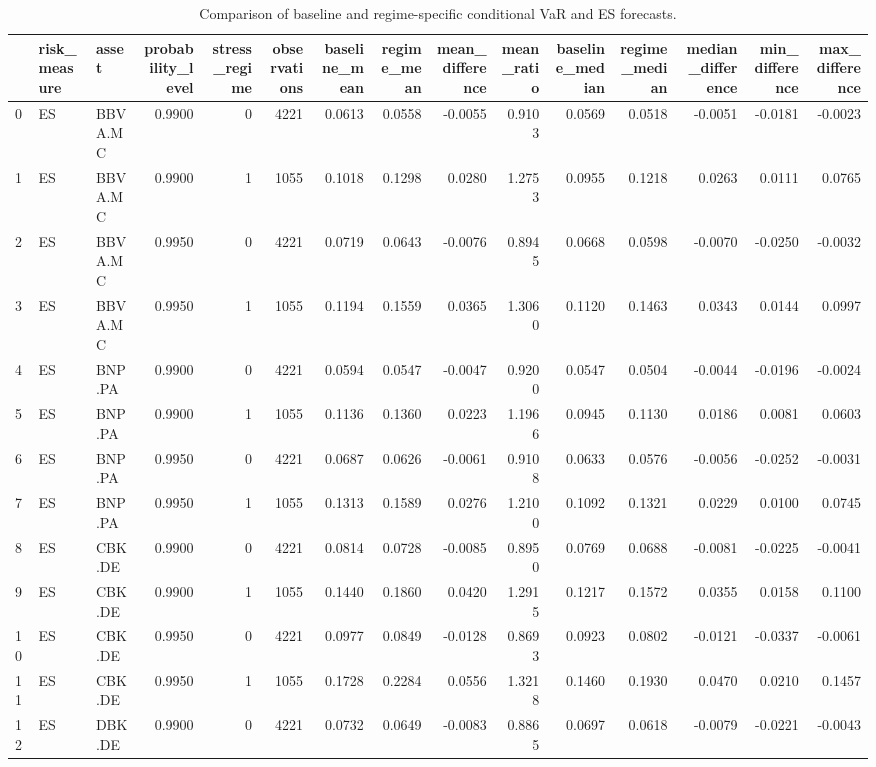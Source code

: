 \begin{table}
\caption{Comparison of baseline and regime-specific conditional VaR and ES forecasts.}
\label{tab:baseline_regime_risk_comparison}
\begin{tabular}{lllrrrrrrrrrrrr}
\toprule
 & risk_measure & asset & probability_level & stress_regime & observations & baseline_mean & regime_mean & mean_difference & mean_ratio & baseline_median & regime_median & median_difference & min_difference & max_difference \\
\midrule
0 & ES & BBVA.MC & 0.9900 & 0 & 4221 & 0.0613 & 0.0558 & -0.0055 & 0.9103 & 0.0569 & 0.0518 & -0.0051 & -0.0181 & -0.0023 \\
1 & ES & BBVA.MC & 0.9900 & 1 & 1055 & 0.1018 & 0.1298 & 0.0280 & 1.2753 & 0.0955 & 0.1218 & 0.0263 & 0.0111 & 0.0765 \\
2 & ES & BBVA.MC & 0.9950 & 0 & 4221 & 0.0719 & 0.0643 & -0.0076 & 0.8945 & 0.0668 & 0.0598 & -0.0070 & -0.0250 & -0.0032 \\
3 & ES & BBVA.MC & 0.9950 & 1 & 1055 & 0.1194 & 0.1559 & 0.0365 & 1.3060 & 0.1120 & 0.1463 & 0.0343 & 0.0144 & 0.0997 \\
4 & ES & BNP.PA & 0.9900 & 0 & 4221 & 0.0594 & 0.0547 & -0.0047 & 0.9200 & 0.0547 & 0.0504 & -0.0044 & -0.0196 & -0.0024 \\
5 & ES & BNP.PA & 0.9900 & 1 & 1055 & 0.1136 & 0.1360 & 0.0223 & 1.1966 & 0.0945 & 0.1130 & 0.0186 & 0.0081 & 0.0603 \\
6 & ES & BNP.PA & 0.9950 & 0 & 4221 & 0.0687 & 0.0626 & -0.0061 & 0.9108 & 0.0633 & 0.0576 & -0.0056 & -0.0252 & -0.0031 \\
7 & ES & BNP.PA & 0.9950 & 1 & 1055 & 0.1313 & 0.1589 & 0.0276 & 1.2100 & 0.1092 & 0.1321 & 0.0229 & 0.0100 & 0.0745 \\
8 & ES & CBK.DE & 0.9900 & 0 & 4221 & 0.0814 & 0.0728 & -0.0085 & 0.8950 & 0.0769 & 0.0688 & -0.0081 & -0.0225 & -0.0041 \\
9 & ES & CBK.DE & 0.9900 & 1 & 1055 & 0.1440 & 0.1860 & 0.0420 & 1.2915 & 0.1217 & 0.1572 & 0.0355 & 0.0158 & 0.1100 \\
10 & ES & CBK.DE & 0.9950 & 0 & 4221 & 0.0977 & 0.0849 & -0.0128 & 0.8693 & 0.0923 & 0.0802 & -0.0121 & -0.0337 & -0.0061 \\
11 & ES & CBK.DE & 0.9950 & 1 & 1055 & 0.1728 & 0.2284 & 0.0556 & 1.3218 & 0.1460 & 0.1930 & 0.0470 & 0.0210 & 0.1457 \\
12 & ES & DBK.DE & 0.9900 & 0 & 4221 & 0.0732 & 0.0649 & -0.0083 & 0.8865 & 0.0697 & 0.0618 & -0.0079 & -0.0221 & -0.0043 \\

\end{tabular}
\end{table}
